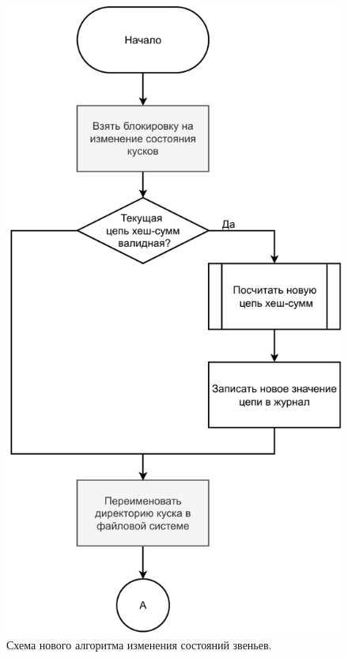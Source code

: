 \begin{figure}[hbtp]
	\centering
	\includegraphics[scale=0.7]{img/mainalgo.pdf}
	\caption{Схема нового алгоритма изменения состояний звеньев.}
	\label{fig:mainalgo}
\end{figure}

\pagebreak

